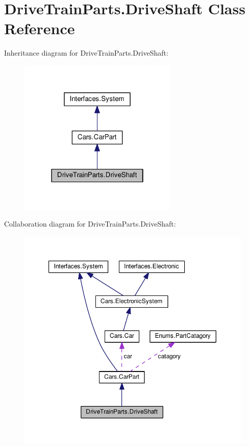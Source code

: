 \hypertarget{classDriveTrainParts_1_1DriveShaft}{}\section{Drive\+Train\+Parts.\+Drive\+Shaft Class Reference}
\label{classDriveTrainParts_1_1DriveShaft}


Inheritance diagram for Drive\+Train\+Parts.\+Drive\+Shaft\+:\nopagebreak
\begin{figure}[H]
\begin{center}
\leavevmode
\includegraphics[width=214pt]{classDriveTrainParts_1_1DriveShaft__inherit__graph}
\end{center}
\end{figure}


Collaboration diagram for Drive\+Train\+Parts.\+Drive\+Shaft\+:\nopagebreak
\begin{figure}[H]
\begin{center}
\leavevmode
\includegraphics[width=350pt]{classDriveTrainParts_1_1DriveShaft__coll__graph}
\end{center}
\end{figure}
